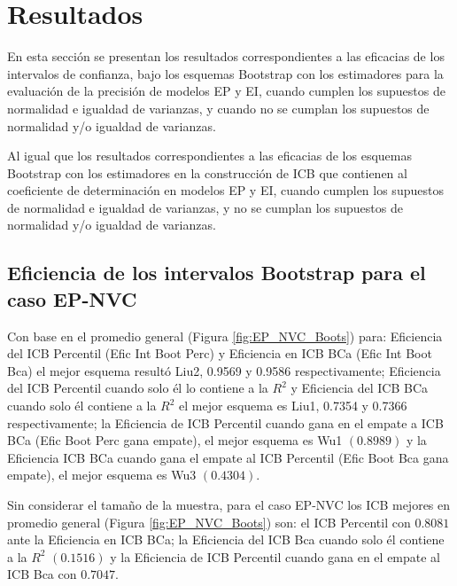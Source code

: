 \section{Resultados}
En esta sección se presentan los resultados correspondientes a las eficacias de los intervalos de confianza, bajo los esquemas Bootstrap con los estimadores para la evaluación de la precisión de modelos EP y EI, cuando cumplen los supuestos de normalidad e igualdad de varianzas, y cuando no se cumplan los supuestos de normalidad y/o igualdad de varianzas.
\vspace{.5cm}

Al igual que los resultados correspondientes a las eficacias de los esquemas Bootstrap con los estimadores en la construcción de ICB que contienen al coeficiente de determinación en modelos EP y EI, cuando cumplen los supuestos de normalidad e igualdad de varianzas, y no se cumplan los supuestos de normalidad y/o igualdad de varianzas.



\subsection{Eficiencia de los intervalos Bootstrap para el caso EP-NVC}
Con base en el promedio general (Figura \ref{fig:EP_NVC_Boots}) para: Eficiencia del ICB Percentil (Efic Int Boot Perc) y Eficiencia en ICB BCa (Efic Int Boot Bca) el mejor esquema resultó Liu2, 0.9569 y 0.9586 respectivamente;
Eficiencia del ICB Percentil cuando solo él lo contiene a la $R^{2}$ y Eficiencia del ICB BCa cuando solo él contiene a la $R^{2}$ el mejor esquema es Liu1, 0.7354 y 0.7366 respectivamente;
la Eficiencia de ICB Percentil cuando gana en el empate a ICB BCa (Efic Boot Perc gana empate), el mejor esquema es Wu1 $(0.8989)$ y la Eficiencia ICB BCa cuando gana el empate al ICB Percentil (Efic Boot Bca gana empate), el mejor esquema es Wu3 $(0.4304)$.
\vspace{.5cm}

Sin considerar el tamaño de la muestra, para el caso EP-NVC los ICB mejores en promedio general (Figura \ref{fig:EP_NVC_Boots}) son: el ICB Percentil con $0.8081$ ante la Eficiencia en ICB BCa; la Eficiencia del ICB Bca cuando solo él contiene a la $R^{2}$ $(0.1516)$ y la Eficiencia de ICB Percentil cuando gana en el empate al ICB Bca con $0.7047$.


